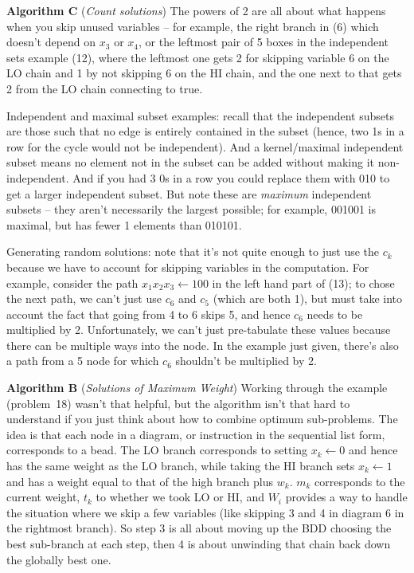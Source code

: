  {\bf Algorithm C} ({\it Count solutions})\hfil\break
The powers of 2 are all about what happens when you skip unused
variables -- for example, the right branch in (6) which doesn't depend
on $x_3$ or $x_4$, or the leftmost pair of 5 boxes in the independent
sets example (12), where the leftmost one gets 2 for skipping variable 6
on the LO chain and 1 by not skipping 6 on the HI chain, and the one
next to that gets 2 from the LO chain connecting to true.

 Independent and maximal subset
examples: recall that the independent subsets are those such that
no edge is entirely contained in the subset (hence, two 1s in a row
for the cycle would not be independent).  And a kernel/maximal
independent subset means no element not in the subset can be
added without making it non-independent.   And if you had 3 0s in 
a row you could replace them with 010 to get a larger independent
subset.  But note these are {\it maximum} independent subsets -- 
they aren't necessarily the largest possible; for example, 001001
is maximal, but has fewer 1 elements than 010101.

 Generating random solutions: note that
it's not quite enough to just use the $c_k$ because we have
to account for skipping variables in the computation.  For example,
consider the path $x_1 x_2 x_3 \gets 1 0 0$ in the left hand part
of (13); to chose the next path, we can't just use $c_6$ and $c_5$
(which are both 1), but must take into account the fact that
going from 4 to 6 skips 5, and hence $c_6$ needs to be multiplied
by 2.  Unfortunately, we can't just pre-tabulate these values because
there can be multiple ways into the node.  In the example just given,
there's also a path from a 5 node for which $c_6$ shouldn't be multiplied
by 2.

 {\bf Algorithm B} ({\it Solutions of Maximum Weight})\hfil\break
Working through the example (problem~18) wasn't that helpful, but the
algorithm isn't that hard to understand if you just think about how to
combine optimum sub-problems.  The idea is that each node in a diagram,
or instruction in the sequential list form, corresponds to a bead.
The LO branch corresponds to setting $x_k \gets 0$ and hence
has the same weight as the LO branch, while taking the HI branch
sets $x_k \gets 1$ and has a weight equal to that of the high branch
plus $w_k$.  $m_k$ corresponds to the current weight, $t_k$ to
whether we took LO or HI, and $W_i$ provides a way to handle
the situation where we skip a few variables (like skipping 3 and 4
in diagram 6 in the rightmost branch).  So step 3 is all about moving up
the BDD choosing the best sub-branch at each step, then 4 is about
unwinding that chain back down the globally best one.

